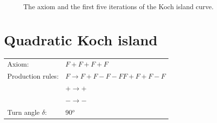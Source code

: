 \documentclass[11pt]{article}
\begin{document}
\begin{figure}[H]
  \hfill
  \hfill

  \caption{The axiom and the first five iterations of the Koch island curve.}
\end{figure}





\section{Quadratic Koch island}

\begin{tabular}{ll}
Axiom: & $F + F + F + F$ \\
Production rules: & $F \to F + F - F - F F + F + F - F$ \\
& $+ \to +$ \\
& $- \to -$ \\
Turn angle $\delta$: & 90$^o$ \\
\end{tabular}
\end{document}
